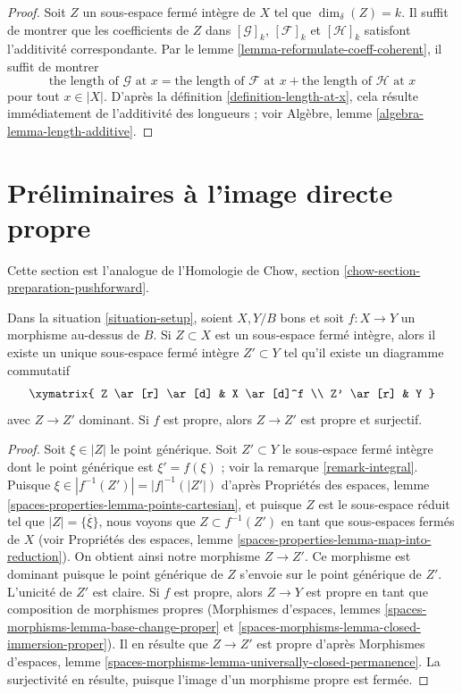 \begin{proof}
Soit $Z$ un sous-espace fermé intègre de $X$ tel que $\dim_\delta(Z) = k$. Il
suffit de montrer que les coefficients de $Z$ dans $[\mathcal{G}]_k$,
$[\mathcal{F}]_k$ et $[\mathcal{H}]_k$ satisfont l'additivité correspondante.
Par le lemme \ref{lemma-reformulate-coeff-coherent}, il suffit de montrer
$$
\text{the length of }\mathcal{G}\text{ at }x =
\text{the length of }\mathcal{F}\text{ at }x +
\text{the length of }\mathcal{H}\text{ at }x
$$
pour tout $x \in |X|$. D'après la définition \ref{definition-length-at-x},
cela résulte immédiatement de l'additivité des longueurs ; voir Algèbre, lemme
\ref{algebra-lemma-length-additive}.
\end{proof}





\section{Préliminaires à l'image directe propre}
\label{section-preparation-pushforward}

\noindent
Cette section est l'analogue de l'Homologie de Chow, section
\ref{chow-section-preparation-pushforward}.

\begin{lemma}
\label{lemma-proper-image}
Dans la situation \ref{situation-setup}, soient $X,Y/B$ bons et soit $f : X
\to Y$ un morphisme au-dessus de $B$. Si $Z \subset X$ est un sous-espace fermé
intègre, alors il existe un unique sous-espace fermé intègre $Z' \subset Y$
tel qu'il existe un diagramme commutatif
$$
\xymatrix{
Z \ar[r] \ar[d] & X \ar[d]^f \\
Z' \ar[r] & Y
}
$$
avec $Z \to Z'$ dominant. Si $f$ est propre, alors $Z \to Z'$ est propre et
surjectif.
\end{lemma}

\begin{proof}
Soit $\xi \in |Z|$ le point générique. Soit $Z' \subset Y$ le sous-espace
fermé intègre dont le point générique est $\xi' = f(\xi)$ ; voir la remarque
\ref{remark-integral}. Puisque $\xi \in |f^{-1}(Z')| = |f|^{-1}(|Z'|)$ d'après
Propriétés des espaces, lemme \ref{spaces-properties-lemma-points-cartesian},
et puisque $Z$ est le sous-espace réduit tel que $|Z| =
\overline{\{\xi\}}$, nous voyons que $Z \subset f^{-1}(Z')$ en tant que
sous-espaces fermés de $X$ (voir Propriétés des espaces, lemme
\ref{spaces-properties-lemma-map-into-reduction}). On obtient ainsi notre
morphisme $Z \to Z'$. Ce morphisme est dominant puisque le point générique de
$Z$ s'envoie sur le point générique de $Z'$. L'unicité de $Z'$ est claire. Si
$f$ est propre, alors $Z \to Y$ est propre en tant que
composition de morphismes propres (Morphismes d'espaces, lemmes
\ref{spaces-morphisms-lemma-base-change-proper} et
\ref{spaces-morphisms-lemma-closed-immersion-proper}). Il en résulte que $Z \to
Z'$ est propre d'après Morphismes d'espaces, lemme
\ref{spaces-morphisms-lemma-universally-closed-permanence}. La surjectivité en
résulte, puisque l'image d'un morphisme propre est fermée.
\end{proof}

